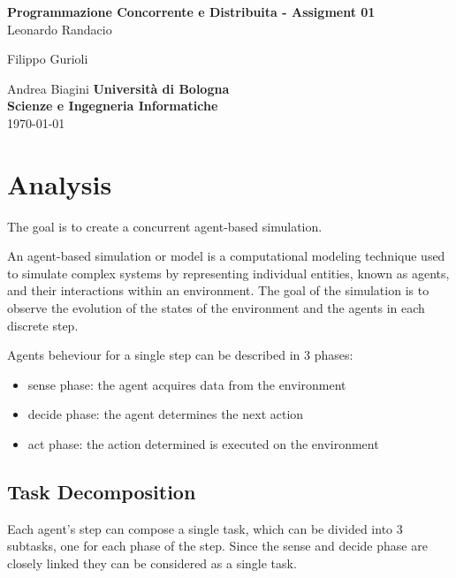 \documentclass[12pt, a4paper]{report}
\begin{document}
\renewcommand\bibname{References} %


\begin{titlepage}

\begin{center}

\Large \textbf {Programmazione Concorrente e Distribuita - Assigment 01}\\%
\vspace{1em}%
\vfill
Leonardo Randacio


Filippo Gurioli


Andrea Biagini
\vspace{1em}
\vfill
{\bf Università di Bologna \\ Scienze e Ingegneria Informatiche}\\[0.5in]

       
\vfill
\today

\end{center}

\end{titlepage}


\tableofcontents
\listoffigures
\listoftables

\newpage
{} %

\chapter{Analysis}
The goal is to create a concurrent agent-based simulation.

An agent-based simulation or model is a computational modeling
 technique used to simulate complex systems by representing individual
 entities, known as agents, and their interactions within an environment.
 The goal of the simulation is to observe the evolution of the states of the
 environment and the agents in each discrete step.

Agents beheviour for a single step can be described in 3 phases:
\begin{itemize}
   \item sense phase: the agent acquires data from the environment
   \item decide phase: the agent determines the next action
   \item act phase: the action determined is executed on the environment
\end{itemize}

\section{Task Decomposition}
Each agent's step can compose a single task, which can be divided into 3 subtasks,
 one for each phase of the step. Since the sense and decide phase are closely
 linked they can be considered as a single task.
\end{document}
